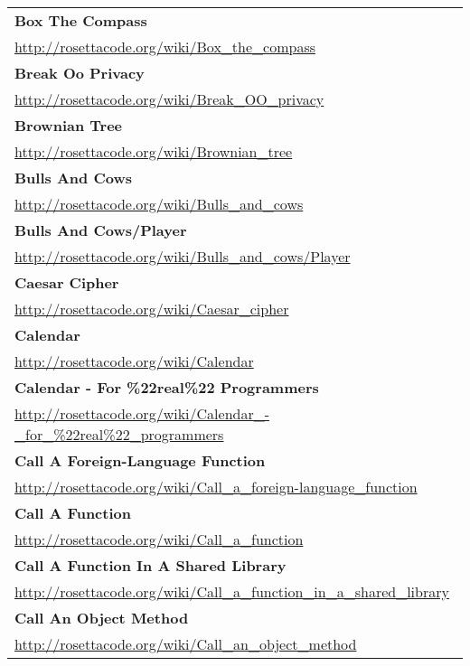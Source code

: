 \begin{longtable}{l}
\textbf{Box The Compass } \\ \href{http://rosettacode.org/wiki/Box\_the\_compass}{http://rosettacode.org/wiki/Box\_the\_compass} \\
\textbf{
Break Oo Privacy } \\ \href{http://rosettacode.org/wiki/Break\_OO\_privacy}{http://rosettacode.org/wiki/Break\_OO\_privacy} \\
\textbf{Brownian Tree } \\ \href{http://rosettacode.org/wiki/Brownian\_tree}{http://rosettacode.org/wiki/Brownian\_tree} \\
\textbf{Bulls And Cows } \\ \href{http://rosettacode.org/wiki/Bulls\_and\_cows}{http://rosettacode.org/wiki/Bulls\_and\_cows} \\
\textbf{
Bulls And Cows/Player } \\ \href{http://rosettacode.org/wiki/Bulls\_and\_cows/Player}{http://rosettacode.org/wiki/Bulls\_and\_cows/Player} \\
\textbf{Caesar Cipher } \\ \href{http://rosettacode.org/wiki/Caesar\_cipher}{http://rosettacode.org/wiki/Caesar\_cipher} \\
\textbf{Calendar } \\ \href{http://rosettacode.org/wiki/Calendar}{http://rosettacode.org/wiki/Calendar} \\
\textbf{
Calendar - For \%22real\%22 Programmers } \\ \href{http://rosettacode.org/wiki/Calendar\_-\_for\_\%22real\%22\_programmers}{http://rosettacode.org/wiki/Calendar\_-\_for\_\%22real\%22\_programmers} \\
\textbf{
Call A Foreign-Language Function } \\ \href{http://rosettacode.org/wiki/Call\_a\_foreign-language\_function}{http://rosettacode.org/wiki/Call\_a\_foreign-language\_function} \\
\textbf{Call A Function } \\ \href{http://rosettacode.org/wiki/Call\_a\_function}{http://rosettacode.org/wiki/Call\_a\_function} \\
\textbf{
Call A Function In A Shared Library } \\ \href{http://rosettacode.org/wiki/Call\_a\_function\_in\_a\_shared\_library}{http://rosettacode.org/wiki/Call\_a\_function\_in\_a\_shared\_library} \\
\textbf{Call An Object Method } \\ \href{http://rosettacode.org/wiki/Call\_an\_object\_method}{http://rosettacode.org/wiki/Call\_an\_object\_method} \\

\end{longtable}
